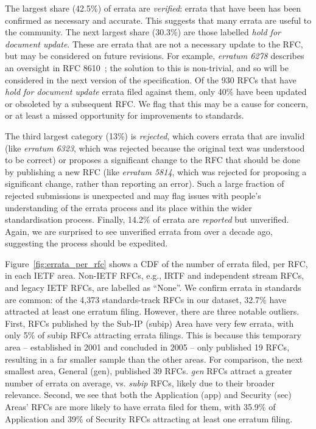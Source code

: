 \documentclass[twocolumn,10pt]{article}
\newcommand{\pb}[1]{\vspace{0.75ex}\noindent{\textbf{#1}}}
\begin{document}
The largest share (42.5\%) of errata are \emph{verified}: errata that have
been has been confirmed as necessary and accurate. This suggests that many
errata are useful to the community. The next largest share (30.3\%) are
those labelled \emph{hold for document update}.  These are errata that are
not a necessary update to the RFC, but may be considered on future
revisions. For example, \emph{erratum 6278} describes an oversight in RFC
8610~\cite{rfc8610}; the solution to this is non-trivial, and so will be
considered in the next version of the specification. Of the 930 RFCs that
have \emph{hold for document update} errata filed against them, only 40\%
have been updated or obsoleted by a subsequent RFC.  We flag that this may
be a cause for concern, or at least a missed opportunity for improvements
to standards.

The third largest category (13\%) is \emph{rejected}, which covers errata
that are invalid (like \emph{erratum 6323}, which was rejected because the
original text was understood to be correct) or proposes a significant
change to the RFC that should be done by publishing a new RFC (like
\emph{erratum 5814}, which was rejected for proposing a significant change,
rather than reporting an error). Such a large fraction of rejected
submissions is unexpected and may flag issues with people's understanding
of the errata process and its place within the wider standardisation
process.  Finally, 14.2\% of errata are \emph{reported} but unverified.
Again, we are surprised to see unverified errata from over a decade ago,
suggesting the process should be expedited. 


\pb{Errata per RFC Area, Status, and Stream:}
Figure~\ref{fig:errata_per_rfc} shows a CDF of the number of errata filed,
per RFC, in each IETF area. Non-IETF RFCs, e.g., IRTF and independent stream
RFCs, and legacy IETF RFCs, are labelled as ``None''.  We confirm errata in
standards are common: of the 4,373 standards-track RFCs in our dataset,
32.7\% have attracted at least one erratum filing.  However, there are
three notable outliers.  First, RFCs published by the Sub-IP (subip) Area
have very few errata, with only 5\% of subip RFCs attracting errata
filings. This is because this temporary area -- established in 2001 and
concluded in 2005 -- only published 19 RFCs, resulting in a far smaller
sample than the other areas. For comparison, the next smallest area,
General (gen), published 39 RFCs. \emph{gen} RFCs attract a greater number
of errata on average, vs. \emph{subip} RFCs, likely due to their broader
relevance.  Second, we see that both the Application (app) and Security
(sec) Areas' RFCs are more likely to have errata filed for them, with
35.9\% of Application and 39\% of Security RFCs attracting at least one
erratum filing.
\end{document}
